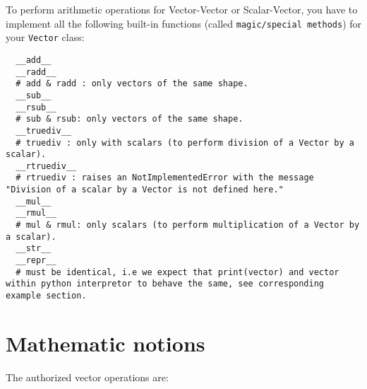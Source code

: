 To perform arithmetic operations for Vector-Vector or Scalar-Vector, you have to implement all the following built-in functions (called \texttt{magic/special methods}) for your \texttt{Vector} class:

\begin{verbatim}
  __add__
  __radd__
  # add & radd : only vectors of the same shape.
  __sub__
  __rsub__
  # sub & rsub: only vectors of the same shape.
  __truediv__
  # truediv : only with scalars (to perform division of a Vector by a scalar).
  __rtruediv__
  # rtruediv : raises an NotImplementedError with the message "Division of a scalar by a Vector is not defined here."
  __mul__
  __rmul__
  # mul & rmul: only scalars (to perform multiplication of a Vector by a scalar).
  __str__
  __repr__
  # must be identical, i.e we expect that print(vector) and vector within python interpretor to behave the same, see corresponding example section.
\end{verbatim}



\section*{Mathematic notions}
The authorized vector operations are:  


